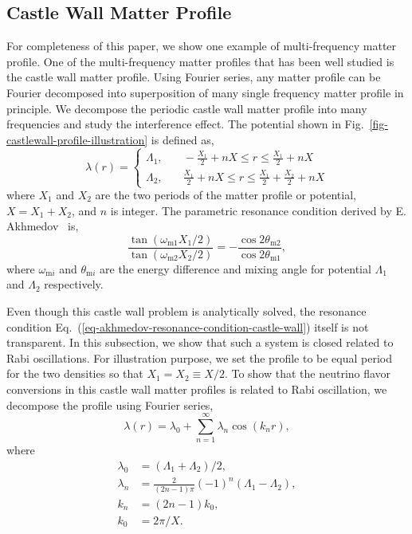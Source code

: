 \documentclass[%
reprint,
 amsmath,amssymb,
 prd,
]{revtex4-1}
\begin{document}
\subsection{Castle Wall Matter Profile}



For completeness of this paper, we show one example of multi-frequency matter profile. One of the multi-frequency matter profiles that has been well studied is the castle wall matter profile. Using Fourier series, any matter profile can be Fourier decomposed into superposition of many single frequency matter profile in principle. We decompose the periodic castle wall matter profile into many frequencies and study the interference effect. The potential shown in Fig.~\ref{fig-castlewall-profile-illustration} is defined as,
\begin{equation}
    \lambda(r) = \begin{cases} 
\Lambda_1, &\quad -\frac{X_1}{2}+nX\le r\le \frac{X_1}{2}+nX \\
\Lambda_2, &\quad \frac{X_1}{2}+nX\le r\le \frac{X_1}{2}+\frac{X_2}{2} +nX
\end{cases}
\label{eq-castle-wall-potential}
\end{equation}
where $X_1$ and $X_2$ are the two periods of the matter profile or potential, $X=X_1+X_2$, and $n$ is integer. The parametric resonance condition derived by E. Akhmedov~\cite{Akhmedov2000} is,
\begin{equation}
    \frac{\tan (\omega_{\mathrm m1}X_1/2)}{\tan (\omega_{\mathrm m2}X_2/2)} = - \frac{\cos 2\theta_{\mathrm m2}}{\cos 2\theta_{\mathrm m1}},
    \label{eq-akhmedov-resonance-condition-castle-wall}
\end{equation}
where $\omega_{\mathrm{m}i}$ and $\theta_{\mathrm{m}i}$ are the energy difference and mixing angle for potential $\Lambda_1$ and $\Lambda_2$ respectively.



Even though this castle wall problem is analytically solved, the resonance condition Eq.~(\ref{eq-akhmedov-resonance-condition-castle-wall}) itself is not transparent. In this subsection, we show that such a system is closed related to Rabi oscillations. For illustration purpose, we set the profile to be equal period for the two densities so that $X_1=X_2\equiv X/2$. To show that the neutrino flavor conversions in this castle wall matter profiles is related to Rabi oscillation, we decompose the profile using Fourier series,
\begin{equation}
\lambda(r) = \lambda_0 + \sum_{n=1}^{\infty} \lambda_n \cos\left( k_n  r \right),
\label{eq-castle-wall-fourier-expanded}
\end{equation}
where 
\begin{align*}
\lambda_0 &= (\Lambda_1 + \Lambda_2)/2, \\
\lambda_n & = \frac{2}{(2n-1)\pi}  (-1)^n  \left( \Lambda_1 -  \Lambda_2 \right),\\
k_n &= (2n-1)k_0, \\
k_0 &= 2\pi/X.
\end{align*}
\end{document}
